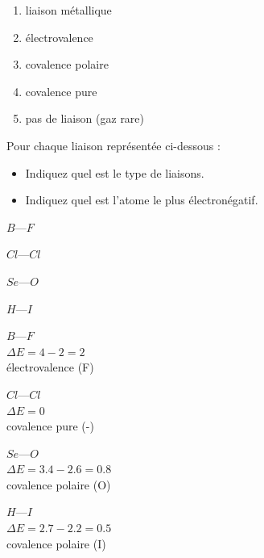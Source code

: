 \documentclass[
  11pt,
  a4paper,
  openany]{book}
\providecommand{\tightlist}{%
  \setlength{\itemsep}{0pt}\setlength{\parskip}{0pt}}
\begin{document}
\begin{Answer}

\begin{enumerate}
\def\labelenumi{\alph{enumi}.}
\tightlist
\item
  liaison métallique
\item
  électrovalence
\item
  covalence polaire
\item
  covalence pure
\item
  pas de liaison (gaz rare)
\end{enumerate}

\end{Answer}

\newpage

\begin{Exercise}

Pour chaque liaison représentée ci-dessous :

\begin{itemize}
\tightlist
\item
  Indiquez quel est le type de liaisons.
\item
  Indiquez quel est l'atome le plus électronégatif.
\end{itemize}

\begin{multicols}{4}
\(B—F\)

\(Cl—Cl\)

\(Se—O\)

\(H—I\)

\end{multicols}


\end{Exercise}

\begin{Answer}

\begin{multicols}{2}
\(B—F\)\\
\(\Delta E = 4 - 2 = 2\)\\
électrovalence (F)

\(Cl—Cl\)\\
\(\Delta E = 0\)\\
covalence pure (-)

\(Se—O\)\\
\(\Delta E = 3.4 - 2.6 = 0.8\)\\
covalence polaire (O)

\(H—I\)\\
\(\Delta E = 2.7 - 2.2 = 0.5\)\\
covalence polaire (I)

\end{multicols}

\end{Answer}
\end{document}
